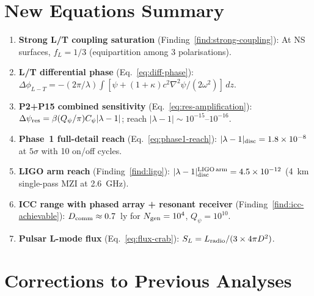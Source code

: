 \documentclass[11pt]{article}
\newcommand{\ee}[1]{\times 10^{#1}}
\newcommand{\lam}{\lambda}
\begin{document}
\section*{New Equations Summary}

\begin{enumerate}

\item \textbf{Strong L/T coupling saturation} (Finding~\ref{find:strong-coupling}):
At NS surfaces, $f_L = 1/3$ (equipartition among 3 polarisations).

\item \textbf{L/T differential phase} (Eq.~\ref{eq:diff-phase}):
$\Delta\phi_{L-T} = -(2\pi/\lambda)\int[\psi + (1+\kappa)c^2
\nabla^2\psi/(2\omega^2)]\,dz$.

\item \textbf{P2+P15 combined sensitivity}
(Eq.~\ref{eq:res-amplification}):
$\Delta\psi_{\rm res} = \beta(Q_\psi/\pi)C_\psi|\lam-1|$;
reach $|\lam-1| \sim 10^{-15}$--$10^{-16}$.

\item \textbf{Phase~1 full-detail reach}
(Eq.~\ref{eq:phase1-reach}):
$|\lam-1|_{\rm disc} = 1.8\ee{-8}$ at $5\sigma$ with 10 on/off
cycles.

\item \textbf{LIGO arm reach} (Finding~\ref{find:ligo}):
$|\lam-1|_{\rm disc}^{\rm LIGO\,arm} = 4.5\ee{-12}$
(4~km single-pass MZI at 2.6~GHz).

\item \textbf{ICC range with phased array + resonant receiver}
(Finding~\ref{find:icc-achievable}):
$D_{\rm comm} \approx 0.7$~ly for $N_{\rm gen} = 10^4$,
$Q_\psi = 10^{10}$.

\item \textbf{Pulsar L-mode flux} (Eq.~\ref{eq:flux-crab}):
$S_L = L_{\rm radio}/(3 \times 4\pi D^2)$.

\end{enumerate}

\section*{Corrections to Previous Analyses}
\end{document}
